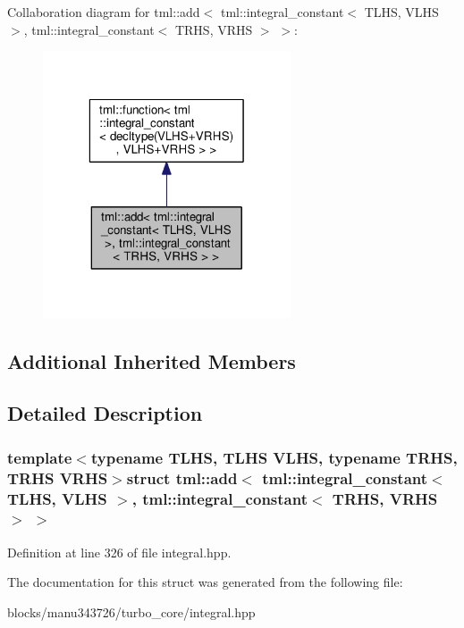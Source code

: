 Collaboration diagram for tml\+:\+:add$<$ tml\+:\+:integral\+\_\+constant$<$ T\+L\+H\+S, V\+L\+H\+S $>$, tml\+:\+:integral\+\_\+constant$<$ T\+R\+H\+S, V\+R\+H\+S $>$ $>$\+:
\nopagebreak
\begin{figure}[H]
\begin{center}
\leavevmode
\includegraphics[width=208pt]{structtml_1_1add_3_01tml_1_1integral__constant_3_01_t_l_h_s_00_01_v_l_h_s_01_4_00_01tml_1_1integ7b1aa22c6a151e4a9f17989eb6ef4a1a}
\end{center}
\end{figure}
\subsection*{Additional Inherited Members}


\subsection{Detailed Description}
\subsubsection*{template$<$typename T\+L\+H\+S, T\+L\+H\+S V\+L\+H\+S, typename T\+R\+H\+S, T\+R\+H\+S V\+R\+H\+S$>$struct tml\+::add$<$ tml\+::integral\+\_\+constant$<$ T\+L\+H\+S, V\+L\+H\+S $>$, tml\+::integral\+\_\+constant$<$ T\+R\+H\+S, V\+R\+H\+S $>$ $>$}



Definition at line 326 of file integral.\+hpp.



The documentation for this struct was generated from the following file\+:\begin{DoxyCompactItemize}
\item 
blocks/manu343726/turbo\+\_\+core/integral.\+hpp\end{DoxyCompactItemize}
